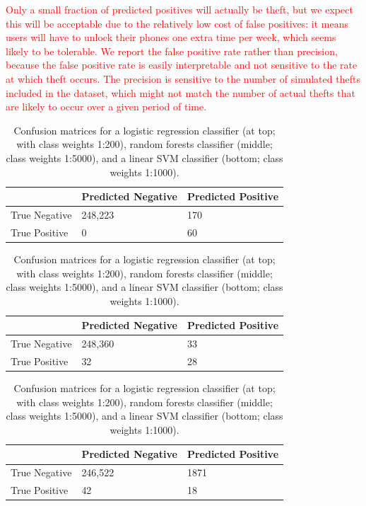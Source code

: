 \textcolor{red}{Only a small fraction of predicted positives will actually be theft, but we expect this will be acceptable due to the relatively low cost of false positives: it means users will have to unlock their phones one extra time per week, which seems likely to be tolerable. We report the false positive rate rather than precision, because the false positive rate is easily interpretable and not sensitive to the rate at which theft occurs. The precision is sensitive to the number of simulated thefts included in the dataset, which might not match the number of actual thefts that are likely to occur over a given period of time.}


\begin{table}[t]
\centering
\begin{tabular}{@{}lll@{}}
\toprule
              & Predicted Negative & Predicted Positive \\ \midrule
True Negative & 248,223             & 170                \\
True Positive & 0                  & 60                 \\ \bottomrule
\end{tabular}

\begin{tabular}{@{}lll@{}}
\toprule
              & Predicted Negative & Predicted Positive \\ \midrule
True Negative & 248,360             & 33                 \\
True Positive & 32                 & 28                 \\ \bottomrule
\end{tabular}

\begin{tabular}{@{}lll@{}}
\toprule
              & Predicted Negative & Predicted Positive \\ \midrule
True Negative & 246,522             & 1871               \\
True Positive & 42                 & 18                 \\ \bottomrule
\end{tabular}
\caption{Confusion matrices for a logistic regression classifier (at top; with class weights 1:200), random forests classifier (middle; class weights 1:5000), and a linear SVM classifier (bottom; class weights 1:1000).}
\label{fig:cmat}
\end{table}


